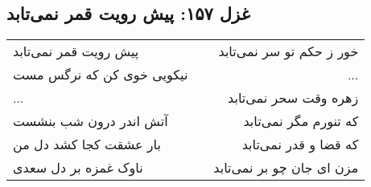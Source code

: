 \begin{center}
\section*{غزل ۱۵۷: پیش رویت قمر نمی‌تابد}
\label{sec:157}
\begin{longtable}{l p{0.5cm} r}
پیش رویت قمر نمی‌تابد
&&
خور ز حکم تو سر نمی‌تابد
\\
نیکویی خوی کن که نرگس مست
&&
...
\\
...
&&
زهره وقت سحر نمی‌تابد
\\
آتش اندر درون شب بنشست
&&
که تنورم مگر نمی‌تابد
\\
بار عشقت کجا کشد دل من
&&
که قضا و قدر نمی‌تابد
\\
ناوک غمزه بر دل سعدی
&&
مزن ای جان چو بر نمی‌تابد
\\
\end{longtable}
\end{center}
